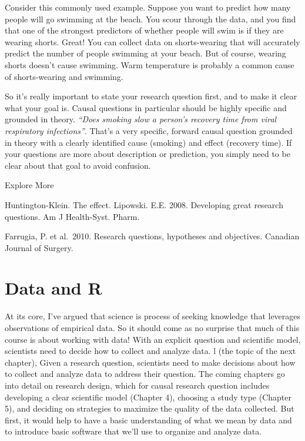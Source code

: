 \documentclass[
]{book}
\begin{document}
Consider this commonly used example. Suppose you want to predict how many people will go swimming at the beach. You scour through the data, and you find that one of the strongest predictors of whether people will swim is if they are wearing shorts. Great! You can collect data on shorts-wearing that will accurately predict the number of people swimming at your beach. But of course, wearing shorts doesn't cause swimming. Warm temperature is probably a common cause of shorts-wearing and swimming.

So it's really important to state your research question first, and to make it clear what your goal is. Causal questions in particular should be highly specific and grounded in theory. \emph{``Does smoking slow a person's recovery time from viral respiratory infections''}. That's a very specific, forward causal question grounded in theory with a clearly identified cause (smoking) and effect (recovery time). If your questions are more about description or prediction, you simply need to be clear about that goal to avoid confusion.

Explore More

Huntington-Klein. The effect. Lipowski. E.E. 2008. Developing great research questions. Am J Health-Syst. Pharm.

Farrugia, P. et al.~2010. Research questions, hypotheses and objectives. Canadian Journal of Surgery.

\chapter{Data and R}\label{data-and-r}

At its core, I've argued that science is process of seeking knowledge that leverages observations of empirical data. So it should come as no surprise that much of this course is about working with data! With an explicit question and scientific model, scientists need to decide how to collect and analyze data. l (the topic of the next chapter), Given a research question, scientists need to make decisions about how to collect and analyze data to address their question. The coming chapters go into detail on research design, which for causal research question includes developing a clear scientific model (Chapter 4), choosing a study type (Chapter 5), and deciding on strategies to maximize the quality of the data collected. But first, it would help to have a basic understanding of what we mean by data and to introduce basic software that we'll use to organize and analyze data.
\end{document}
